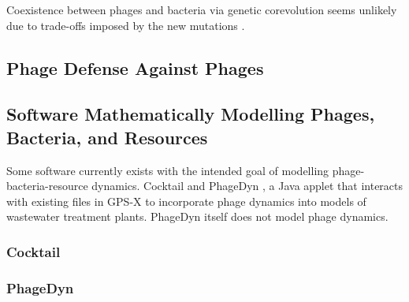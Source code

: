 Coexistence between phages and bacteria via genetic corevolution seems unlikely due to trade-offs imposed by the new mutations \cite{bullOptimalityModelsPhage2006}. 


\subsection{Phage Defense Against Phages}


\subsection{Software Mathematically Modelling Phages, Bacteria, and Resources}
Some software currently exists with the intended goal of modelling phage-bacteria-resource dynamics. 
Cocktail \cite{nilssonCocktailComputerProgram2022} and PhageDyn \cite{krysiak-baltynSimulationPhageDynamics2017}, a Java applet that interacts with existing files in GPS-X \cite{AdvancedWastewaterModelling} to incorporate phage dynamics into models of wastewater treatment plants. PhageDyn itself does not model phage dynamics. 
\subsubsection{Cocktail}
\cite{nilssonCocktailComputerProgram2022}

\subsubsection{PhageDyn}
\cite{krysiak-baltynSimulationPhageDynamics2017}